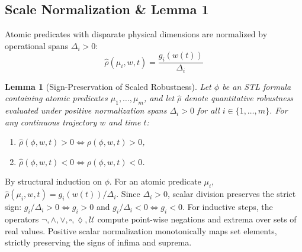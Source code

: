 \documentclass[journal]{IEEEtran}
\newtheorem{lemma}{Lemma}
\begin{document}
\subsection{Scale Normalization \& Lemma 1}
Atomic predicates with disparate physical dimensions are normalized by operational spans $\Delta_i > 0$:
\begin{equation}
\label{eq:scale_norm}
\hat{\rho}(\mu_i, w, t) = \frac{g_i(w(t))}{\Delta_i}
\end{equation}

\begin{lemma}[Sign-Preservation of Scaled Robustness]
\label{lem:sign_preservation}
Let $\phi$ be an STL formula containing atomic predicates $\mu_1, \dots, \mu_m$, and let $\hat{\rho}$ denote quantitative robustness evaluated under positive normalization spans $\Delta_i > 0$ for all $i \in \{1, \dots, m\}$. For any continuous trajectory $w$ and time $t$:
\begin{enumerate}
    \item $\hat{\rho}(\phi, w, t) > 0 \iff \rho(\phi, w, t) > 0$,
    \item $\hat{\rho}(\phi, w, t) < 0 \iff \rho(\phi, w, t) < 0$.
\end{enumerate}
\end{lemma}
\begin{IEEEproof}
By structural induction on $\phi$. For an atomic predicate $\mu_i$, $\hat{\rho}(\mu_i, w, t) = g_i(w(t))/\Delta_i$. Since $\Delta_i > 0$, scalar division preserves the strict sign: $g_i/\Delta_i > 0 \iff g_i > 0$ and $g_i/\Delta_i < 0 \iff g_i < 0$. For inductive steps, the operators $\neg, \land, \lor, \square, \lozenge, \mathcal{U}$ compute point-wise negations and extrema over sets of real values. Positive scalar normalization monotonically maps set elements, strictly preserving the signs of infima and suprema.
\end{IEEEproof}
\end{document}
